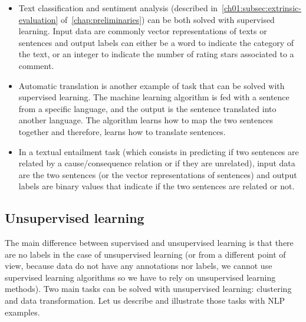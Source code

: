     \begin{itemize}
      \item Text classification and sentiment analysis (described
        in~\autoref{ch01:subsec:extrinsic-evaluation}
        of~\autoref{chap:preliminaries}) can be both solved with supervised
        learning. Input data are commonly vector representations of texts or
        sentences and output labels can either be a word to indicate the
        category of the text, or an integer to indicate the number of rating
        stars associated to a comment.
      \item Automatic translation is another example of task that can be solved
        with supervised learning. The machine learning algorithm is fed with a
        sentence from a specific language, and the output is the sentence
        translated into another language. The algorithm learns how to map the
        two sentences together and therefore, learns how to translate sentences.
      \item In a textual entailment task (which consists in predicting if two
        sentences are related by a cause/consequence relation or if they are
        unrelated), input data are the two sentences (or the vector
        representations of sentences) and output labels are binary values that
        indicate if the two sentences are related or not.
    \end{itemize}

  \subsection{Unsupervised learning}
    \label{ch02:subsec:unsupervised-learning}
    The main difference between supervised and unsupervised learning is that
    there are no labels in the case of unsupervised learning (or from a
    different point of view, because data do not have any annotations nor labels, we
    cannot use supervised learning algorithms so we have to rely on
    unsupervised learning methods). Two main tasks can be solved with
    unsupervised learning: clustering and data transformation. Let us describe
    and illustrate those tasks with NLP examples.

